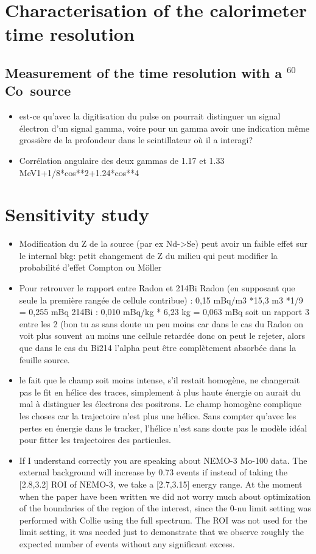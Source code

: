 \documentclass[a4paper,12pt, twoside]{memoir}   	%
\newcommand{\Co}{$^{60}$Co}
\begin{document}
\chapter{Characterisation of the calorimeter time resolution}
\section{Measurement of the time resolution with a \Co\ source}
\begin{itemize}
\item est-ce qu'avec la digitisation du pulse on pourrait distinguer un signal électron d'un signal gamma, voire pour un gamma avoir une indication même grossière de la profondeur dans le scintillateur où il a interagi?
\item Corrélation angulaire des deux gammas de 1.17 et 1.33 MeV1+1/8*cos**2+1.24*cos**4
\end{itemize}


\chapter{Sensitivity study}
\begin{itemize}
\item Modification du Z de la source (par ex Nd->Se) peut avoir un faible effet sur le internal bkg: petit changement de Z du milieu qui peut modifier la probabilité d'effet Compton ou Möller
\item Pour retrouver le rapport entre Radon et 214Bi
Radon (en supposant que seule la première rangée de cellule contribue) : 0,15 mBq/m3 *15,3 m3 *1/9 = 0,255 mBq
214Bi : 0,010 mBq/kg * 6,23  kg = 0,063 mBq
soit un rapport 3 entre les 2 (bon tu as sans doute un peu moins car dans le cas du Radon on voit plus souvent au moins une cellule retardée donc on peut le rejeter, alors que dans le cas du Bi214 l'alpha peut être complètement absorbée dans la feuille source.
\item  le fait que le champ soit moins intense, s'il restait homogène, ne changerait pas le fit en hélice des traces, simplement à plus haute énergie on aurait du mal à distinguer les électrons des positrons.
Le champ homogène complique les choses car la trajectoire n'est plus une hélice.
Sans compter qu'avec les pertes en énergie dans le tracker, l'hélice n'est sans doute pas le modèle idéal pour fitter les trajectoires des particules.
\item If I understand correctly you are speaking about NEMO-3 Mo-100 data.
The external background will increase by 0.73 events if
instead of taking the [2.8,3.2] ROI of NEMO-3, we take a [2.7,3.15] energy range.
At the moment when the paper have been written we did not worry much about
optimization of the boundaries of the region of the interest, since the 0-nu limit
setting was performed with Collie using the full spectrum.
The ROI was not used for the limit setting, it was needed just to demonstrate that
we observe roughly the expected number of events without any significant excess.
\end{itemize}
\end{document}
